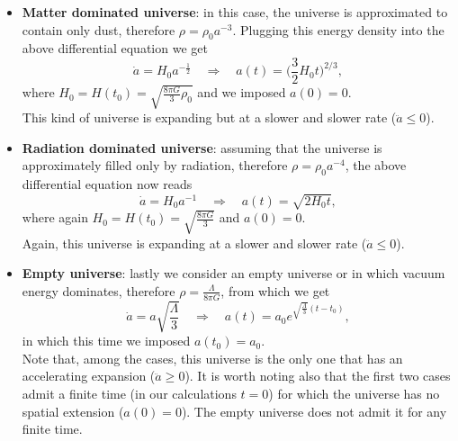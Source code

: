 \begin{itemize}
    \item \textbf{Matter dominated universe}: in this case, the universe is approximated to contain only dust, therefore $\rho=\rho_0a^{-3}$. Plugging this energy density into the above differential equation we get$$\dot a=H_0a^{-\frac{1}{2}}\quad \Rightarrow\quad a(t)=\bigg(\frac{3}{2}H_0t\bigg)^{2/3},$$ where $H_0=H(t_0)=\sqrt{\frac{8\pi G}{3}\rho_0}$ and we imposed $a(0)=0$.\\ This kind of universe is expanding but at a slower and slower rate ($\ddot a\leq0$).
    \item  \textbf{Radiation dominated universe}: assuming that the universe is approximately filled only by radiation, therefore $\rho=\rho_0a^{-4}$, the above differential equation now reads$$\dot a=H_0a^{-1}\quad \Rightarrow\quad a(t)=\sqrt{2H_0t},$$ where again $H_0=H(t_0)=\sqrt{\frac{8\pi G}{3}}$ and $a(0)=0$.\\ Again, this universe is expanding at a slower and slower rate ($\ddot a\leq0$).
    \item \textbf{Empty universe}: lastly we consider an empty universe or in which vacuum energy dominates, therefore $\rho=\frac{\Lambda}{8\pi G}$, from which we get$$\dot a=a\sqrt{\frac{\Lambda}{3}}\quad \Rightarrow\quad a(t)=a_0e^{\sqrt{\frac{\Lambda}{3}}(t-t_0)},$$
     in which this time we imposed $a(t_0)=a_0$.\\Note that, among the cases, this universe is the only one that has an accelerating expansion ($\ddot a\geq0$). It is worth noting also that the first two cases admit a finite time (in our calculations $t=0$) for which the universe has no spatial extension ($a(0)=0$). The empty universe does not admit it for any finite time. 
\end{itemize}
